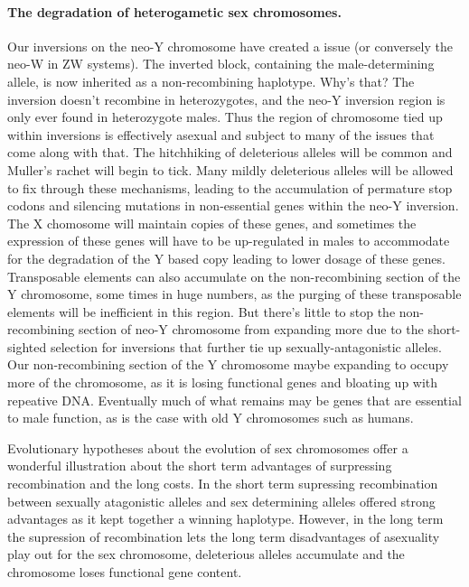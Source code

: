 \paragraph{The degradation of heterogametic sex chromosomes.} 
Our inversions on the neo-Y chromosome have created a issue (or conversely the neo-W in ZW systems). The inverted block, containing the male-determining allele, is now inherited as a non-recombining haplotype. Why's that? The inversion doesn't recombine in heterozygotes, and the neo-Y inversion region is only ever found in heterozygote males. Thus the region of chromosome tied up within inversions is effectively asexual and subject to many of the issues that come along with that. The hitchhiking of deleterious alleles will be common and Muller's rachet will begin to tick. Many mildly deleterious alleles will be allowed to fix through these mechanisms, leading to the accumulation of permature stop codons and silencing mutations in non-essential genes within the neo-Y inversion. The X chomosome will maintain copies of these genes, and sometimes the expression of these genes will have to be up-regulated in males to accommodate for the degradation of the Y based copy leading to lower dosage of these genes.  Transposable elements can also accumulate on the non-recombining section of the Y chromosome, some times in huge numbers, as the purging of these transposable elements will be inefficient in this region.  But there's little to stop the non-recombining section of neo-Y chromosome from expanding more due to the short-sighted selection for inversions that further tie up sexually-antagonistic alleles. Our non-recombining section of the Y chromosome maybe expanding to occupy more of the chromosome, as it is losing functional genes and bloating up with repeative DNA. Eventually much of what remains may be genes that are essential to male function, as is the case with old Y chromosomes such as humans. 

Evolutionary hypotheses about the evolution of sex chromosomes offer a wonderful illustration about the short term advantages of surpressing recombination and the long costs. In the short term supressing recombination between sexually atagonistic alleles and sex determining alleles offered strong advantages as it kept together a winning haplotype. However, in the long term the supression of recombination lets the long term disadvantages of asexuality play out for the sex chromosome, deleterious alleles accumulate and the chromosome loses functional gene content.  


